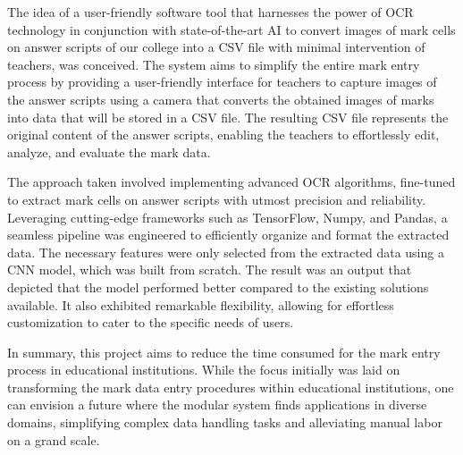\vspace{3mm}

\noindent The idea of a user-friendly software tool that harnesses the power of OCR technology in conjunction with state-of-the-art AI to convert images of mark cells on answer scripts of our college into a CSV file with minimal intervention of teachers, was conceived. The system aims to simplify the entire mark entry process by providing a user-friendly interface for teachers to capture images of the answer scripts using a camera that converts the obtained images of marks into data that will be stored in a CSV file. The resulting CSV file represents the original content of the answer scripts, enabling the teachers to effortlessly edit, analyze, and evaluate the mark data.

\vspace{3mm}

\noindent The approach taken involved implementing advanced OCR algorithms, fine-tuned to extract mark cells on answer scripts with utmost precision and reliability. Leveraging cutting-edge frameworks such as TensorFlow, Numpy, and Pandas, a seamless pipeline was engineered to efficiently organize and format the extracted data. The necessary features were only selected from the extracted data using a CNN model, which was built from scratch. The result was an output that depicted that the model performed better compared to the existing solutions available. It also exhibited remarkable flexibility, allowing for effortless customization to cater to the specific needs of users.

\vspace{3mm}

\noindent In summary, this project aims to reduce the time consumed for the mark entry process in educational institutions. While the focus initially was laid on transforming the mark data entry procedures within educational institutions, one can envision a future where the modular system finds applications in diverse domains, simplifying complex data handling tasks and alleviating manual labor on a grand scale.




\tableofcontents
\printnomenclature
\listoffigures
\listofabbreviations
\listoftables
\clearpage


